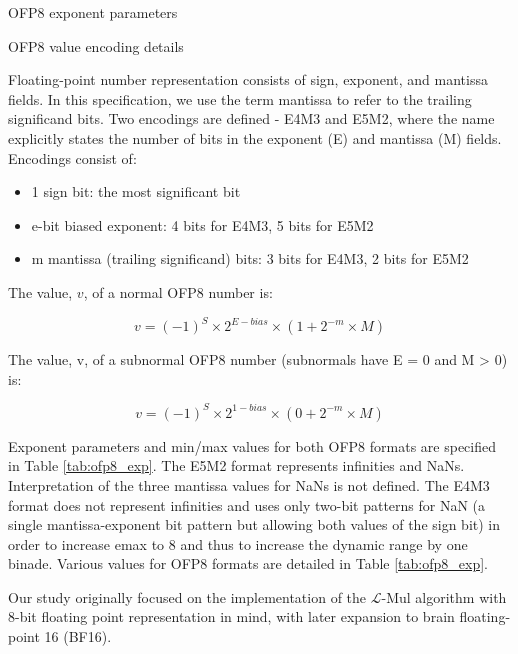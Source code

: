 \documentclass[12pt,letterpaper]{article}
\newcommand{\lmul}{$\mathcal{L}$-Mul\xspace}
\begin{document}
\begin{table}[htbp]
    \caption{OFP8 exponent parameters}
    \label{tab:ofp8_exp}
    \resizebox{0.5\linewidth}{!}{}
\end{table}

\begin{table}[htbp]
    \caption{OFP8 value encoding details}
    \label{tab:ofp8_encode}
    \resizebox{.9\linewidth}{!}{}
\end{table}

Floating-point number representation consists of sign, exponent, and mantissa fields. In this specification, we use the term mantissa to refer to the trailing significand bits. Two encodings are defined - E4M3 and E5M2, where the name explicitly states the number of bits in the exponent (E) and mantissa (M) fields. Encodings consist of:

\begin{itemize}
    \item 1 sign bit: the most significant bit
    \item e-bit biased exponent: 4 bits for E4M3, 5 bits for E5M2
    \item m mantissa (trailing significand) bits: 3 bits for E4M3, 2 bits for E5M2
\end{itemize}

The value, $v$, of a normal OFP8 number is:

$$ v = (-1)^S \times 2^{E - bias} \times (1 + 2^{−m} \times M) $$

The value, v, of a subnormal OFP8 number (subnormals have E = 0 and M > 0) is:

$$ v = (-1)^S \times 2^{1-bias} \times (0 + 2^{-m} \times M) $$

Exponent parameters and min/max values for both OFP8 formats are specified in Table \ref{tab:ofp8_exp}. The E5M2 format represents infinities and NaNs. Interpretation of the three mantissa values for NaNs is not defined. The E4M3 format does not represent infinities and uses only two-bit patterns for NaN (a single mantissa-exponent bit pattern but allowing both values of the sign bit) in order to increase emax to 8 and thus to increase the dynamic range by one binade. Various values for OFP8 formats are detailed in Table \ref{tab:ofp8_exp}.

Our study originally focused on the implementation of the \lmul algorithm with 8-bit floating point representation in mind, with later expansion to brain floating-point 16 (BF16).
\end{document}
